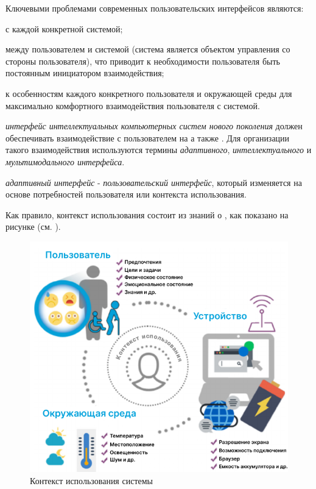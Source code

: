 Ключевыми проблемами современных пользовательских интерфейсов являются:
\begin{textitemize}
	\item {} с каждой конкретной системой;
	\item {} между пользователем и системой (система является объектом управления со стороны пользователя), что приводит к необходимости пользователя быть постоянным инициатором взаимодействия;
	\item {} к особенностям каждого конкретного пользователя и окружающей среды для максимально комфортного взаимодействия пользователя с системой.
\end{textitemize}

\textit{интерфейс интеллектуальных компьютерных систем нового поколения} должен обеспечивать взаимодействие с пользователем на  а также  . Для организации такого взаимодействия используются термины \textit{адаптивного}, \textit{интеллектуального} и \textit{мультимодального интерфейса}.

\textit{адаптивный интерфейс} - \textit{пользовательский интерфейс}, который изменяется на основе потребностей пользователя или контекста использования.

Как правило, контекст использования состоит из знаний о , как показано на рисунке  (см. ).

\begin{figure}[H]
	\centering
	\includegraphics[scale=0.5]{author/part4/figures/user-context.png}
	\caption{Контекст использования системы}
	\label{fig:use_context}
\end{figure}

